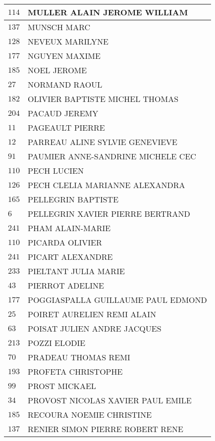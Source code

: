 \begin{xltabular}{\linewidth}{|l|X|}
    \hline
    $114$ & MULLER ALAIN JEROME WILLIAM \\
    \hline
    $137$ & MUNSCH MARC \\
    \hline
    $128$ & NEVEUX MARILYNE \\
    \hline
    $177$ & NGUYEN MAXIME \\
    \hline
    $185$ & NOEL JEROME \\
    \hline
    $27$ & NORMAND RAOUL \\
    \hline
    $182$ & OLIVIER BAPTISTE MICHEL THOMAS \\
    \hline
    $204$ & PACAUD JEREMY \\
    \hline
    $11$ & PAGEAULT PIERRE \\
    \hline
    $12$ & PARREAU ALINE SYLVIE GENEVIEVE \\
    \hline
    $91$ & PAUMIER ANNE-SANDRINE MICHELE CEC \\
    \hline
    $110$ & PECH LUCIEN \\
    \hline
    $126$ & PECH CLELIA MARIANNE ALEXANDRA \\
    \hline
    $165$ & PELLEGRIN BAPTISTE \\
    \hline
    $6$ & PELLEGRIN XAVIER PIERRE BERTRAND \\
    \hline
    $241$ & PHAM ALAIN-MARIE \\
    \hline
    $110$ & PICARDA OLIVIER \\
    \hline
    $241$ & PICART ALEXANDRE \\
    \hline
    $233$ & PIELTANT JULIA MARIE \\
    \hline
    $43$ & PIERROT ADELINE \\
    \hline
    $177$ & POGGIASPALLA GUILLAUME PAUL EDMOND \\
    \hline
    $25$ & POIRET AURELIEN REMI ALAIN \\
    \hline
    $63$ & POISAT JULIEN ANDRE JACQUES \\
    \hline
    $213$ & POZZI ELODIE \\
    \hline
    $70$ & PRADEAU THOMAS REMI \\
    \hline
    $193$ & PROFETA CHRISTOPHE \\
    \hline
    $99$ & PROST MICKAEL \\
    \hline
    $34$ & PROVOST NICOLAS XAVIER PAUL EMILE \\
    \hline
    $185$ & RECOURA NOEMIE CHRISTINE \\
    \hline
    $137$ & RENIER SIMON PIERRE ROBERT RENE \\

\end{xltabular}
